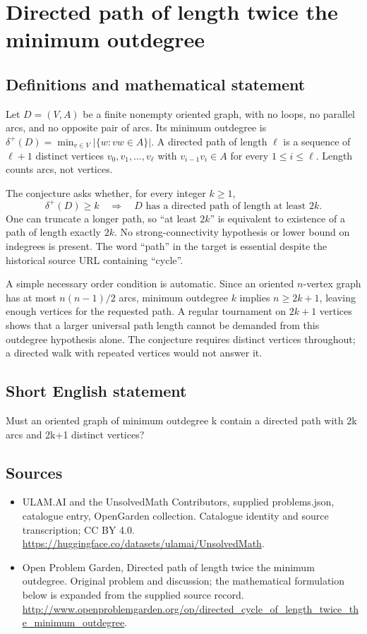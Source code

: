 \documentclass[11pt,a4paper]{article}
\begin{document}
\section*{Directed path of length twice the minimum outdegree}\label{statement}

\subsection{Definitions and mathematical statement}
Let $D=(V,A)$ be a finite nonempty oriented graph, with no loops, no
parallel arcs, and no opposite pair of arcs. Its minimum outdegree is
$\delta^+(D)=\min_{v\in V}|\{w:vw\in A\}|$. A directed path of length
$\ell$ is a sequence of $\ell+1$ distinct vertices
$v_0,v_1,\ldots,v_\ell$ with $v_{i-1}v_i\in A$ for every
$1\le i\le\ell$. Length counts arcs, not vertices.

The conjecture asks whether, for every integer $k\ge1$,
\[
       \delta^+(D)\ge k
       \quad\Longrightarrow\quad
       D\text{ has a directed path of length at least }2k.
\]
One can truncate a longer path, so ``at least $2k$'' is equivalent to
existence of a path of length exactly $2k$. No strong-connectivity
hypothesis or lower bound on indegrees is present. The word ``path''
in the target is essential despite the historical source URL containing
``cycle''.

A simple necessary order condition is automatic. Since an oriented
$n$-vertex graph has at most $n(n-1)/2$ arcs, minimum outdegree $k$
implies $n\ge2k+1$, leaving enough vertices for the requested path.
A regular tournament on $2k+1$ vertices shows that a larger universal
path length cannot be demanded from this outdegree hypothesis alone.
The conjecture requires distinct vertices throughout; a directed walk
with repeated vertices would not answer it.
\subsection{Short English statement}
Must an oriented graph of minimum outdegree k contain a directed path with 2k arcs and 2k+1 distinct vertices?
\subsection{Sources}
\begin{itemize}
\item[S1] ULAM.AI and the UnsolvedMath Contributors, supplied problems.json, catalogue entry, OpenGarden collection. Catalogue identity and source transcription; CC BY 4.0.
\url{https://huggingface.co/datasets/ulamai/UnsolvedMath}.
\item[S2] Open Problem Garden, Directed path of length twice the minimum outdegree. Original problem and discussion; the mathematical formulation below is expanded from the supplied source record.
\url{http://www.openproblemgarden.org/op/directed_cycle_of_length_twice_the_minimum_outdegree}.
\end{itemize}
\end{document}
